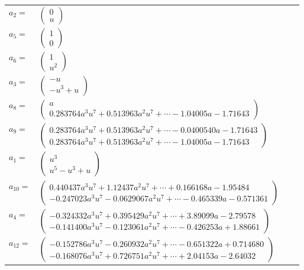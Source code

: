 \documentclass[1p]{elsarticle_modified}
\theoremstyle{definition}
\begin{document}
\begin{tabular}{m{7pt} m{180pt} m{7pt} m{180pt} }
\flushright $a_{2}=$&$\begin{pmatrix}0\\u\end{pmatrix}$ \\
\flushright $a_{5}=$&$\begin{pmatrix}1\\0\end{pmatrix}$ \\
\flushright $a_{6}=$&$\begin{pmatrix}1\\u^2\end{pmatrix}$ \\
\flushright $a_{3}=$&$\begin{pmatrix}- u\\- u^3+u\end{pmatrix}$ \\
\flushright $a_{8}=$&$\begin{pmatrix}a\\0.283764 a^{3} u^{7}+0.513963 a^{2} u^{7}+\cdots-1.04005 a-1.71643\end{pmatrix}$ \\
\flushright $a_{9}=$&$\begin{pmatrix}0.283764 a^{3} u^{7}+0.513963 a^{2} u^{7}+\cdots-0.0400540 a-1.71643\\0.283764 a^{3} u^{7}+0.513963 a^{2} u^{7}+\cdots-1.04005 a-1.71643\end{pmatrix}$ \\
\flushright $a_{1}=$&$\begin{pmatrix}u^3\\u^5- u^3+u\end{pmatrix}$ \\
\flushright $a_{10}=$&$\begin{pmatrix}0.440437 a^{3} u^{7}+1.12437 a^{2} u^{7}+\cdots+0.166168 a-1.95484\\-0.247023 a^{3} u^{7}-0.0629067 a^{2} u^{7}+\cdots-0.465339 a-0.571361\end{pmatrix}$ \\
\flushright $a_{4}=$&$\begin{pmatrix}-0.324332 a^{3} u^{7}+0.395429 a^{2} u^{7}+\cdots+3.89099 a-2.79578\\-0.141400 a^{3} u^{7}-0.123061 a^{2} u^{7}+\cdots-0.426253 a+1.88661\end{pmatrix}$ \\
\flushright $a_{12}=$&$\begin{pmatrix}-0.152786 a^{3} u^{7}-0.260932 a^{2} u^{7}+\cdots-0.651322 a+0.714680\\-0.168076 a^{3} u^{7}+0.726751 a^{2} u^{7}+\cdots+2.04153 a-2.64032\end{pmatrix}$ \\

\end{tabular}
\end{document}
